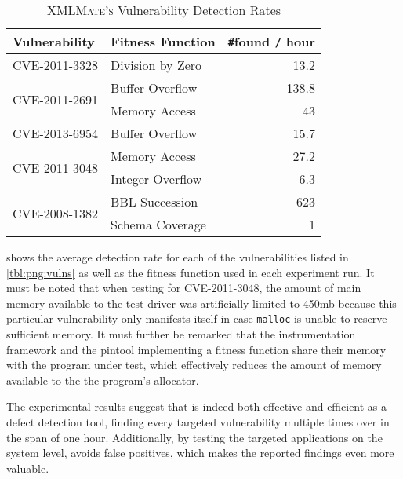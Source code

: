 \begin{table}[H]
\centering
\begin{tabular}{|l|l|r|}
\hline
Vulnerability                  & Fitness Function & \texttt\#found \texttt{/} hour \\ \hline \hline
CVE-2011-3328                  & Division by Zero & 13.2           \\ \hline \hline
\multirow{2}{*}{CVE-2011-2691} & Buffer Overflow  & 138.8          \\ \cline{2-3} 
                               & Memory Access    & 43             \\ \hline \hline
CVE-2013-6954                  & Buffer Overflow  & 15.7           \\ \hline \hline
\multirow{2}{*}{CVE-2011-3048} & Memory Access    & 27.2           \\ \cline{2-3}
							   & Integer Overflow & 6.3			   \\ \hline \hline
\multirow{2}{*}{CVE-2008-1382} & BBL Succession   & 623            \\ \cline{2-3}
                               & Schema Coverage  & 1              \\ \hline
\end{tabular}
\caption{\textsc{XMLMate's} Vulnerability Detection Rates}
\label{tbl:png:rates}
\end{table}

 shows the average detection rate for each of the vulnerabilities listed in
\cref{tbl:png:vulns} as well as the fitness function used in each experiment run. It must be noted that when
testing for {\small CVE-2011-3048}, the amount of main memory available to the test driver was artificially
limited to 450mb because this particular vulnerability only manifests itself in case \texttt{malloc} is unable
to reserve sufficient memory. It must further be remarked that the \pin instrumentation framework and the
pintool implementing a fitness function share their memory with the program under test, which effectively
reduces the amount of memory available to the the program's allocator.
 
The experimental results suggest that \xmlmate is indeed both effective and efficient as a defect detection
tool, finding every targeted vulnerability multiple times over in the span of one hour. Additionally, by
testing the targeted applications on the system level, \xmlmate avoids false positives, which makes the
reported findings even more valuable.

